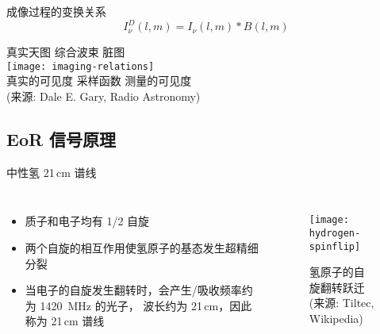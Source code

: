 \documentclass{beamer}
\begin{document}
\begin{frame}{成像过程的变换关系}
  \vspace{-1ex}
  \begin{equation}
    I_{\nu}^D(l,m) = I_{\nu}(l,m) * B(l,m)
  \end{equation}
  \begin{center}
    \footnotesize\noindent
    真实天图 \hspace{4em} 综合波束 \hspace{4.5em} 脏图 \\
    \texttt{[image: imaging-relations]} \\
    真实的可见度 \hspace{2.5em} 采样函数 \hspace{3em} 测量的可见度 \\
    (来源: Dale E. Gary, Radio Astronomy)
  \end{center}
\end{frame}

\subsection{EoR 信号原理}

\begin{frame}{中性氢 21\texorpdfstring{\,}{ }cm 谱线}
  \begin{columns}
    \begin{itemize}
      \item 质子和电子均有 1/2 自旋
      \item 两个自旋的相互作用使氢原子的基态发生\alert{超精细分裂}
      \item 当电子的自旋发生翻转时，会产生/吸收频率约为 \SI{1420}{\MHz} 的光子，
        波长约为 21\,cm，因此称为 \alert{21\,cm 谱线}
    \end{itemize}

    \begin{figure}
      \centering
      \texttt{[image: hydrogen-spinflip]}
      \caption{氢原子的自旋翻转跃迁\\(来源: Tiltec, Wikipedia)}
    \end{figure}
  \end{columns}
\end{frame}
\end{document}
